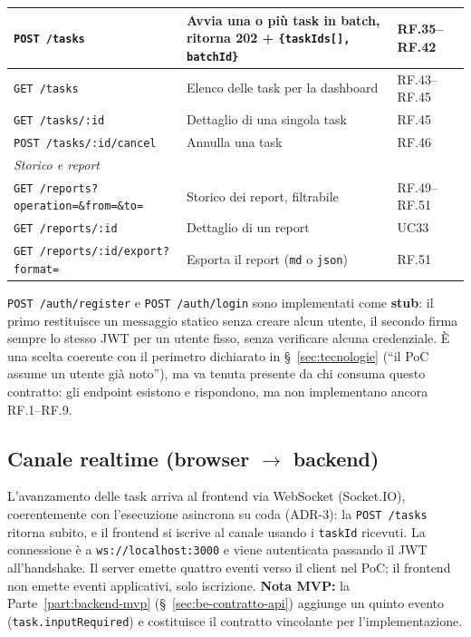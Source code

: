 \documentclass[11pt,a4paper]{article}
\begin{document}
\begin{table}[H]
\begin{tabularx}{\textwidth}{|l|X|l|}
\texttt{POST /tasks} & Avvia una o più task in batch, ritorna 202 + \texttt{\{taskIds[], batchId\}} & RF.35--RF.42 \\ \hline
\texttt{GET /tasks} & Elenco delle task per la dashboard & RF.43--RF.45 \\ \hline
\texttt{GET /tasks/:id} & Dettaglio di una singola task & RF.45 \\ \hline
\texttt{POST /tasks/:id/cancel} & Annulla una task & RF.46 \\ \hline
\multicolumn{3}{|l|}{\textit{Storico e report}} \\ \hline
\texttt{GET /reports?operation=\&from=\&to=} & Storico dei report, filtrabile & RF.49--RF.51 \\ \hline
\texttt{GET /reports/:id} & Dettaglio di un report & UC33 \\ \hline
\texttt{GET /reports/:id/export?format=} & Esporta il report (\texttt{md} o \texttt{json}) & RF.51 \\ \hline
\end{tabularx}
\end{table}

\texttt{POST /auth/register} e \texttt{POST /auth/login} sono implementati come \textbf{stub}: il primo restituisce un messaggio statico senza creare alcun utente, il secondo firma sempre lo stesso JWT per un utente fisso, senza verificare alcuna credenziale. È una scelta coerente con il perimetro dichiarato in \S~\ref{sec:tecnologie} (``il PoC assume un utente già noto''), ma va tenuta presente da chi consuma questo contratto: gli endpoint esistono e rispondono, ma non implementano ancora RF.1--RF.9.

\subsection{Canale realtime (browser $\to$ backend)}
\label{sub:ws}

L'avanzamento delle task arriva al frontend via WebSocket (Socket.IO), coerentemente con l'esecuzione asincrona su coda (ADR-3): la \texttt{POST /tasks} ritorna subito, e il frontend si iscrive al canale usando i \texttt{taskId} ricevuti. La connessione è a \texttt{ws://localhost:3000} e viene autenticata passando il JWT all'handshake. Il server emette quattro eventi verso il client nel PoC; il frontend non emette eventi applicativi, solo iscrizione. \textbf{Nota MVP:} la Parte~\ref{part:backend-mvp} (\S~\ref{sec:be-contratto-api}) aggiunge un quinto evento (\texttt{task.inputRequired}) e costituisce il contratto vincolante per l'implementazione.
\end{document}
